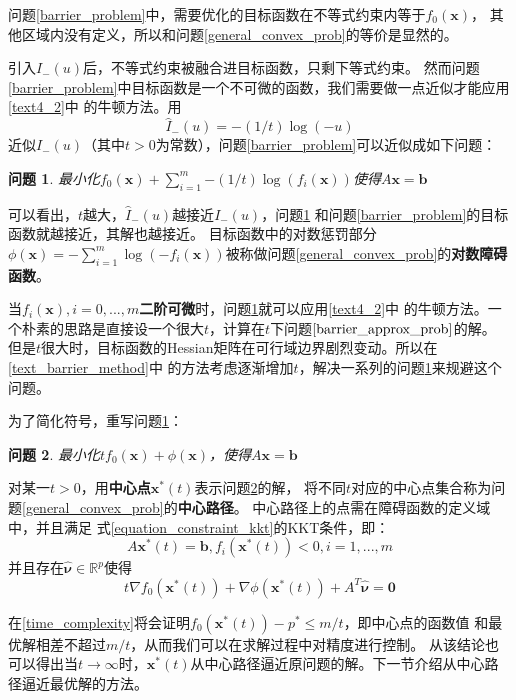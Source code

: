\documentclass{article}
\newtheorem{problem}{问题}
\begin{document}
问题\ref{barrier_problem}中，需要优化的目标函数在不等式约束内等于$f_0(\bm x)$，
其他区域内没有定义，所以和问题\ref{general_convex_prob}的等价是显然的。

引入$I_-(u)$后，不等式约束被融合进目标函数，只剩下等式约束。
然而问题\ref{barrier_problem}中目标函数是一个不可微的函数，我们需要做一点近似才能应用\ref{text4_2}中
的牛顿方法。用
$$\widehat I_-(u)=-(1/t)\log(-u)$$
近似$I_-(u)$（其中$t>0$为常数），问题\ref{barrier_problem}可以近似成如下问题：
\begin{problem}
    最小化$f_0(\bm x)+\sum_{i=1}^m{-(1/t)\log(f_i(\bm x))}$使得$A\bm x=\bm b$
    \label{barrier_approx_prob}
\end{problem}

可以看出，$t$越大，$\widehat I_-(u)$越接近$I_-(u)$，问题\ref{barrier_approx_prob}
和问题\ref{barrier_problem}的目标函数就越接近，其解也越接近。
目标函数中的对数惩罚部分$\phi(\bm x)=-\sum_{i=1}^m\log (-f_i(\bm x))$被称做问题\ref{general_convex_prob}的\textbf{对数障碍函数}。

当$f_i(\bm x),i=0,...,m$\textbf{二阶可微}时，问题\ref{barrier_approx_prob}就可以应用\ref{text4_2}中
的牛顿方法。一个朴素的思路是直接设一个很大$t$，计算在$t$下问题$\ref{barrier_approx_prob}$的解。
但是$t$很大时，目标函数的Hessian矩阵在可行域边界剧烈变动。所以在\ref{text_barrier_method}中
的方法考虑逐渐增加$t$，解决一系列的问题\ref{barrier_approx_prob}来规避这个问题。

为了简化符号，重写问题\ref{barrier_approx_prob}：
\begin{problem}
    最小化$tf_0(\bm x)+\phi(\bm x)$，使得$A\bm x=\bm b$
    \label{barrier_approx_prob_simple}
\end{problem}

对某一$t>0$，用\textbf{中心点}$\bm x^*(t)$表示问题\ref{barrier_approx_prob_simple}的解，
将不同$t$对应的中心点集合称为问题\ref{general_convex_prob}的\textbf{中心路径}。
中心路径上的点需在障碍函数的定义域中，并且满足
式\eqref{equation_constraint_kkt}的KKT条件，即：
$$A\bm x^*(t)=\bm b,f_i(\bm x^*(t))<0,i=1,...,m$$
并且存在$\widehat{\bm \nu}\in \mathbb{R}^p$使得
\begin{equation}t\nabla f_0(\bm x^*(t))+\nabla\phi(\bm x^*(t))+A^T\widehat{\bm \nu}=\bm 0\label{center_path_kkt}\end{equation}

在\ref{time_complexity}将会证明$f_0(\bm x^*(t))-p^*\le m/t$，即中心点的函数值
和最优解相差不超过$m/t$，从而我们可以在求解过程中对精度进行控制。
从该结论也可以得出当$t\rightarrow\infty$时，$\bm x^*(t)$从中心路径逼近原问题的解。下一节介绍从中心路径逼近最优解的方法。
\label{text_barrier_center_path}
\end{document}
